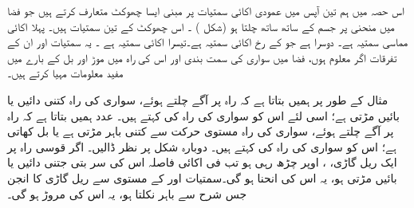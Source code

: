 اس حصہ میں ہم   تین آپس میں عمودی اکائی سمتیات پر مبنی ایسا چھوکٹ متعارف کرتے ہیں جو  فضا میں منحنی پر جسم کے ساتھ ساتھ چلتا ہو (شکل ) ۔ اس چھوکٹ کے تین سمتیات  ہیں۔ پہلا  اکائی مماسی سمتیہ  ہے۔ دوسرا  ہے جو   کے رخ اکائی سمتیہ ہے۔تیسرا اکائی سمتیہ   ہے ۔ یہ سمتیات اور ان کے تفرقات  اگر معلوم ہوں، فضا  میں سواری  کی  سمت بندی اور اس کی راہ  میں موڑ  اور بل  کے بارے میں مفید معلومات   مہیا کرتے ہیں۔

مثال کے طور پر   ہمیں بتاتا ہے  کہ راہ پر  آگے چلتے ہوئے، سواری  کی   راہ کتنی  دائیں یا بائیں  مڑتی  ہے؛ اسی لئے اس کو سواری کی راہ کی کہتے ہیں۔ عدد  ہمیں بتاتا ہے کہ راہ پر آگے چلتے ہوئے،  سواری کی راہ مستوی حرکت سے کتنی باہر مڑتی ہے یا بل کھاتی ہے؛ اس کو سواری کی راہ کی  کہتے ہیں۔ دوبارہ شکل  پر نظر ڈالیں۔ اگر    قوسی راہ پر ایک  ریل گاڑی،   ،   اوپر    چڑھ رہی ہو تب فی اکائی فاصلہ اس   کی   سر بتی جتنی دائیں یا بائیں مڑتی ہو، یہ اس کی انحنا ہو گی۔سمتیات  اور  کے  مستوی سے ریل گاڑی  کا انجن  جس شرح سے باہر  نکلتا  ہو، یہ اس کی مروڑ ہو گی۔ 
